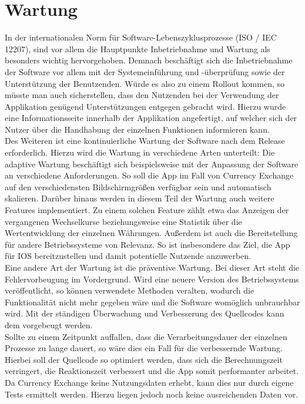 \documentclass[conference]{IEEEtran}
\begin{document}
\section{Wartung}
In der internationalen Norm für Software-Lebenszyklusprozesse (ISO / IEC 12207), sind vor allem die Hauptpunkte Inbetriebnahme und Wartung als besonders wichtig hervorgehoben.
Demnach beschäftigt sich die Inbetriebnahme der Software vor allem mit der Systemeinführung und -überprüfung sowie der Unterstützung der Benutzenden. Würde es also zu einem Rollout kommen, so müsste man auch sicherstellen, dass den Nutzenden bei der Verwendung der Applikation genügend Unterstützungen entgegen gebracht wird. Hierzu wurde eine Informationsseite innerhalb der Applikation angefertigt, auf welcher sich der Nutzer über die Handhabung der einzelnen Funktionen informieren kann. \\
Des Weiteren ist eine kontinuierliche Wartung der Software nach dem Release erforderlich. Hierzu wird die Wartung in verschiedene Arten unterteilt: 
Die adaptive Wartung beschäftigt sich beispielsweise mit der Anpassung der Software an verschiedene Anforderungen. So soll die App im Fall von Currency Exchange auf den verschiedensten Bildschirmgrößen verfügbar sein und automatisch skalieren. Darüber hinaus werden in diesem Teil der Wartung auch weitere Features implementiert. Zu einem solchen Feature zählt etwa das Anzeigen der vergangenen Wechselkurse beziehungsweise eine Statistik über die Wertentwicklung der einzelnen Währungen. Außerdem ist auch die Bereitstellung für andere Betriebssysteme von Relevanz. So ist insbesondere das Ziel, die App für IOS bereitzustellen und damit potentielle Nutzende anzuwerben.\\
Eine andere Art der Wartung ist die präventive Wartung. Bei dieser Art steht die Fehlervorbeugung im Vordergrund. Wird eine neuere Version des Betriebssystems veröffentlicht, so können verwendete Methoden veralten, wodurch die Funktionalität nicht mehr gegeben wäre und die Software womöglich unbrauchbar wird. Mit der ständigen Überwachung und Verbesserung des Quellcodes kann dem vorgebeugt werden. \\
Sollte zu einem Zeitpunkt auffallen, dass die Verarbeitungsdauer der einzelnen Prozesse zu lange dauert, so wäre dies ein Fall für die verbessernde Wartung. Hierbei soll der Quellcode so optimiert werden, dass sich die Berechnungszeit verringert, die Reaktionszeit verbessert und die App somit performanter arbeitet. Da Currency Exchange keine Nutzungsdaten erhebt, kann dies nur durch eigene Tests ermittelt werden. Hierzu liegen jedoch noch keine ausreichenden Daten vor.\\
\end{document}
